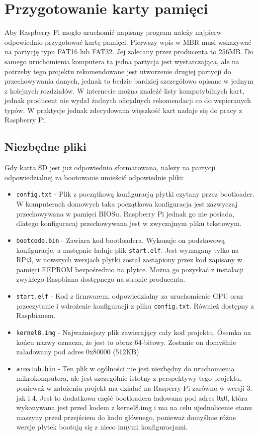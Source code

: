 \documentclass[shortabstract]{iithesis}
\begin{document}
\section{Przygotowanie karty pamięci}
Aby Raspberry Pi mogło uruchomić napisany program należy najpierw odpowiednio przygotować kartę pamięci. Pierwszy wpis w MBR musi wskazywać na partycję typu FAT16 lub FAT32. Jej zalecany przez producenta to 256MB. Do samego uruchomienia komputera ta jedna partycja jest wystarczająca, ale na potrzeby tego projektu rekomendowane jest utworzenie drugiej partycji do przechowywania danych, jednak to bedzie bardziej szczegółowo opisane w jednym z kolejnych rozdziałów. W internecie można znaleźć listy kompatybilnych kart, jednak producent nie wydał żadnych oficjalnych rekomendacji co do wspieranych typów. W praktycje jednak zdecydowana więszkość kart nadaje się do pracy z Raspberry Pi.
\subsection{Niezbędne pliki}
Gdy karta SD jest już odpowiednio sformatowana, należy na partycji odpowiedzialnej za bootowanie umieścić odpowiednie pliki:
\begin{itemize}
 \item \texttt{config.txt}  - Plik z początkową konfiguracją płytki czytany przez bootloader. W komputerach domowych taka początkowa konfiguracja jest zazwyczaj przechowywana w pamięci BIOSu. Raspberry Pi jednak go nie posiada, dlatego konfiguracaj przechowywana jest w zwyczajnym pliku tekstowym.
 \item \texttt{bootcode.bin}  - Zawiara kod bootloadera. Wykonuje on podstawową konfiguracje, a następnie ładuje plik \texttt{start.elf}. Jest wymagany tylko na RPi3, w nowszych wersjach płytki został zastąpiony przez kod zapisany w pamięci EEPROM bezpośrednio na płytce. Można go pozyskać z instalacji zwykłego Raspbiana dostępnego na stronie producenta.
 \item \texttt{start.elf}  - Kod z firmwarem, odpowiedzialny za uruchomienie GPU oraz przeczytanie i wdrożenie konfiguracji z pliku \texttt{config.txt}. Również dostępny z Raspbianem.
 \item \texttt{kernel8.img}  - Najważniejszy plik zawierający cały kod projektu. Ósemka na końcu nazwy oznacza, że jest to obraz 64-bitowy. Zostanie on domyślnie załadowany pod adres 0x80000 (512KB)
 \item \texttt{armstub.bin}  - Ten plik w ogólności nie jest niezbędny do uruchomienia mikrokomputera, ale jest szczególnie istotny z perspektywy tego projektu, ponieważ w założeniu projekt ma działać na Rasperry Pi zarówno w wersji 3. jak i 4. Jest to dodatkowa część bootloadera ładowana pod adres 0x0, która wykonywana jest przed kodem z kernel8.img i ma na celu ujednolicenie stanu maszyny przed przejściem do kodu głównego, ponieważ domyślnie różne wersje płytek bootują się z nieco innymi konfiguracjami.
\end{itemize}
\end{document}
